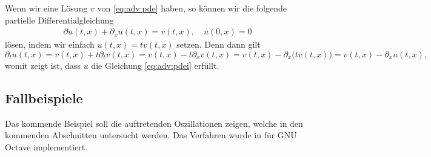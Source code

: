 Wenn wir eine Lösung $v$ von \eqref{eq:adv:pde} haben, so können wir die folgende partielle Differentialgleichung
\begin{align}\label{eq:adv:pdei}
\partial u(t,x) + \partial_x u(t,x) = v(t,x), \quad u(0,x) = 0
\end{align}
lösen, indem wir einfach $u(t,x) = t v(t,x)$ setzen. Denn dann gilt
{\small
\[ \partial_t u(t,x) = v(t,x) + t \partial_t v(t,x) = v(t,x) - t \partial_x v(t,x) = v(t,x) - \partial_x \bigl( t v(t,x) \bigr) = v(t,x) - \partial_x u(t,x), \]
}
womit zeigt ist, dass $u$ die Gleichung \eqref{eq:adv:pdei} erfüllt.

\subsection {Fallbeispiele}

Das kommende Beispiel soll die auftretenden Oszillationen zeigen, welche in den kommenden Abschnitten untersucht werden.
Das Verfahren wurde in für GNU Octave implementiert.

